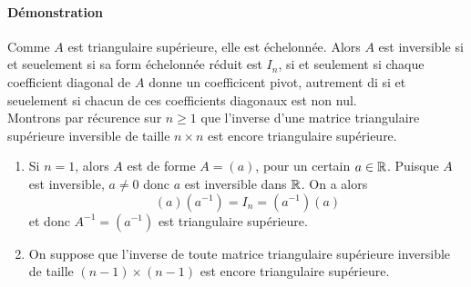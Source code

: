 \paragraph{Démonstration} Comme $A$ est triangulaire supérieure, elle est échelonnée. Alors $A$ est inversible si et seuelement si sa form échelonnée réduit est $I_n$, si et seulement si chaque coefficient diagonal de $A$ donne un coefficicent pivot, autrement di si et seuelement si chacun de ces coefficients diagonaux est non nul. \\
Montrons par récurence sur $n \geq 1$ que l'inverse d'une matrice triangulaire supérieure inversible de taille $n\times n$ est encore triangulaire supérieure.
\begin{enumerate}[(1)]
  \item Si $n=1$, alors $A$ est de forme $A = ( a )$, pour un certain $a \in \mathbb{R}$. Puisque $A$ est inversible, $a \neq 0$ donc $a$ est inversible dans $\mathbb{R}$. On a alors 
    $$(a) (a^{-1}) = I_n = (a^{-1})(a)$$
    et donc $A^{-1} = (a^{-1})$ est triangulaire supérieure.
    
  \item On suppose que l'inverse de toute matrice triangulaire supérieure inversible de taille $(n-1) \times (n-1)$ est encore triangulaire supérieure.
  

\end{enumerate}
